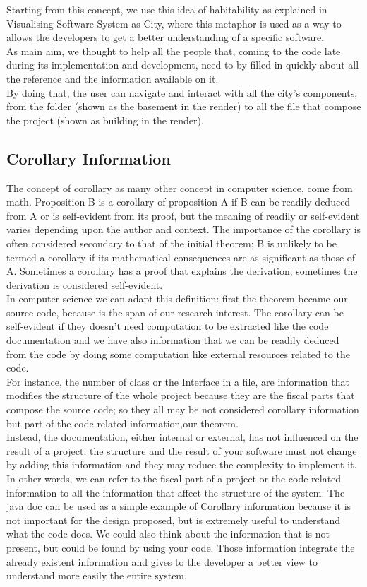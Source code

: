 \documentclass[]{usiinfbachelorproject}
\begin{document}
Starting from this concept, we use this idea of habitability as explained in \cite{vssac} Visualising Software System as City, where this metaphor is used as a way to allows the developers to get a better understanding of a specific software. \\
As main aim, we thought to help all the people that, coming to the code late during its implementation and development, need to by filled in quickly about all the reference and the information available on it.\\
By doing that, the user can navigate and interact with all the city's components, from the folder (shown as the basement in the render) to all the file that compose the project (shown as building in the render). 


\subsection{Corollary Information} 
The concept of corollary as many other concept in computer science, come from math.
Proposition B is a corollary of proposition A if B can be readily deduced from A or is self-evident from its proof, but the meaning of readily or self-evident varies depending upon the author and context. The importance of the corollary is often considered secondary to that of the initial theorem; B is unlikely to be termed a corollary if its mathematical consequences are as significant as those of A. Sometimes a corollary has a proof that explains the derivation; sometimes the derivation is considered self-evident. \cite{wikiCory}\\
In computer science we can adapt this definition: first the theorem became our source code, because is the span of our research interest.
The corollary can be self-evident if they doesn't need computation to be extracted  like the code documentation and we have also information that we  can be readily deduced from the code by doing some computation like external resources related to the code.\\

For instance, the number of class or the Interface in a file, are information that modifies the structure of the whole project because they are the fiscal parts that compose the source code; so they all may be not considered corollary information but part of the code related information,our theorem. \\
Instead, the documentation, either internal or external, has not influenced on the result of a project: the structure and the result of your software must not change by adding this information and they may reduce the complexity to implement it.
In other words, we can refer to the fiscal part of a project or the code related information  to all the information that affect the structure of the system. 
The java doc can be used as a simple example of Corollary information  because it is not important for the design proposed, but is extremely useful to understand what the code does. We could also think about the information that is not present, but could be found by using your code. Those information integrate the already existent information and gives to the developer a better view to understand more easily the entire system.
\end{document}
